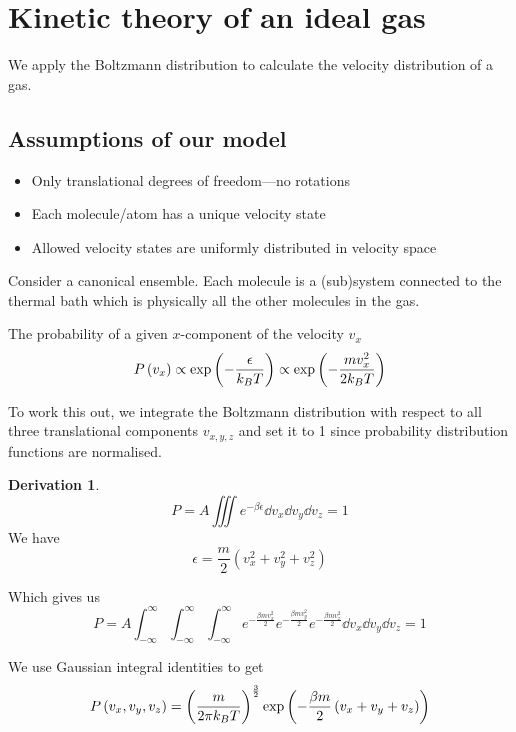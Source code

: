 \documentclass[12pt,chapterprefix=false,dvipsnames]{scrbook}
\theoremstyle{dotless}
\theoremstyle{definition}
\newtheorem{protoderivation}{Derivation}[section]
\newenvironment{derivation}
{\colorlet{shadecolor}{purple!15}\begin{shaded}\begin{protoderivation}}
			{\end{protoderivation}\end{shaded}}
\begin{document}
\section{Kinetic theory of an ideal gas}%
\label{sec:kinetic_theory_of_an_ideal_gas}

We apply the Boltzmann distribution to calculate the velocity
distribution of a gas.

\subsection{Assumptions of our model}%
\label{sub:assumptions_of_our_model}

\begin{itemize}
	\item Only translational degrees of freedom---no rotations
	\item Each molecule/atom has a unique velocity state
	\item Allowed velocity states are uniformly distributed in velocity
	      space
\end{itemize}

Consider a canonical ensemble. Each molecule is a (sub)system
connected to the thermal bath which is physically all the other
molecules in the gas.

The probability of a given $x$-component of
the velocity $v_x$
\begin{equation}
	P\left(v_x\right) \propto
	\exponential\left(-\frac{\epsilon}{k_B T}\right) \propto
	\exponential\left(-\frac{mv^2_x}{2 k_B T}\right)
\end{equation}

To work this out, we integrate the Boltzmann distribution with
respect to all three translational components
$v_{x,y,z}$ and set it to 1 since probability
distribution functions are normalised.
\begin{derivation}
	\begin{equation}
		P = A \iiint
		e^{-\beta \epsilon}\dd{v_x}\dd{v_y}\dd{v_z}
		= 1
	\end{equation}
	We have
	\begin{equation}
		\epsilon
		=
		\frac{m}{2} \left(v_x^2 + v_y^2 + v_z^2\right)
	\end{equation}

	Which gives us
	\begin{equation}
		P = A
		\int_{-\infty}^{\infty}\int_{-\infty}^{\infty}\int_{-\infty}^{\infty}
		e^{-\frac{\beta m v^2_x}{2}}e^{-\frac{\beta m v^2_y}{2}}e^{-\frac{\beta m v^2_z}{2}}\dd{v_x}\dd{v_y}\dd{v_z}
		= 1
	\end{equation}

	We use Gaussian integral identities to get
	\begin{equation}
		P\left(v_x, v_y, v_z\right) =
		{\left(\frac{m}{2\pi k_B T}\right)}^{\frac{3}{2}}\exponential\left(-\frac{\beta m}{2}\left(v_x + v_y + v_z\right)\right)
	\end{equation}
\end{derivation}
\end{document}
